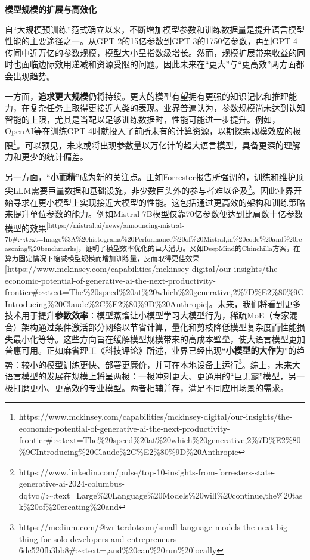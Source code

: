 \documentclass[
  letterpaper,
]{scrbook}
\begin{document}
\textbf{模型规模的扩展与高效化}

自``大规模预训练''范式确立以来，不断增加模型参数和训练数据量是提升语言模型性能的主要途径之一。从GPT-2的15亿参数到GPT-3的1750亿参数，再到GPT-4传闻中近万亿的参数规模，模型大小呈指数级增长。然而，规模扩展带来收益的同时也面临边际效用递减和资源受限的问题。因此未来在``更大''与``更高效''两方面都会出现趋势。

一方面，\textbf{追求更大规模}仍将持续。更大的模型有望拥有更强的知识记忆和推理能力，在复杂任务上取得更接近人类的表现。业界普遍认为，参数规模尚未达到认知智能的上限，尤其是当配以足够训练数据时，性能可能进一步提升。例如，OpenAI等在训练GPT-4时就投入了前所未有的计算资源，以期探索规模效应的极限\footnote{https://www.mckinsey.com/capabilities/mckinsey-digital/our-insights/the-economic-potential-of-generative-ai-the-next-productivity-frontier\#:\textasciitilde:text=The\%20speed\%20at\%20which\%20generative,2\%7D\%E2\%80\%9CIntroducing\%20Claude\%2C\%E2\%80\%9D\%20Anthropic}。可以预见，未来或将出现参数量以万亿计的超大语言模型，具备更深的理解力和更少的统计偏差。

另一方面，``\textbf{小而精}''成为新的关注点。正如Forrester报告所强调的，训练和维护顶尖LLM需要巨量数据和基础设施，非少数巨头外的参与者难以企及\footnote{https://www.linkedin.com/pulse/top-10-insights-from-forresters-state-generative-ai-2024-columbus-dqtvc\#:\textasciitilde:text=Large\%20Language\%20Models\%20will\%20continue,the\%20task\%20of\%20creating\%20and}。因此业界开始寻求在更小模型上实现接近大模型的性能。这包括通过更高效的架构和训练策略来提升单位参数的能力。例如Mistral
7B模型仅靠70亿参数便达到比肩数十亿参数模型的效果\textsuperscript{{[}https://mistral.ai/news/announcing-mistral-7b\#:\textasciitilde:text=Image\%3A\%20histograms\%20Performance\%20of\%20Mistral,in\%20code\%20and\%20reasoning\%20benchmarks{]}，证明了模型效率优化的巨大潜力。又如DeepMind的Chinchilla方案，在算力固定情况下缩减模型规模而增加训练量，反而取得更佳效果}{[}https://www.mckinsey.com/capabilities/mckinsey-digital/our-insights/the-economic-potential-of-generative-ai-the-next-productivity-frontier\#:\textasciitilde:text=The\%20speed\%20at\%20which\%20generative,2\%7D\%E2\%80\%9CIntroducing\%20Claude\%2C\%E2\%80\%9D\%20Anthropic{]}。未来，我们将看到更多技术用于提升\textbf{参数效率}：模型蒸馏让小模型学习大模型行为，稀疏MoE（专家混合）架构通过条件激活部分网络以节省计算，量化和剪枝降低模型复杂度而性能损失最小化等等。这些方向旨在缓解模型规模带来的高成本壁垒，使大语言模型更加普惠可用。正如麻省理工《科技评论》所述，业界已经出现``\textbf{小模型的大作为}''的趋势：较小的模型训练更快、部署更廉价，并可在本地设备上运行\footnote{https://medium.com/@writerdotcom/small-language-models-the-next-big-thing-for-solo-developers-and-entrepreneurs-6dc520fb3bb8\#:\textasciitilde:text=,and\%20can\%20run\%20locally}。综上，未来大语言模型的发展在规模上将呈两极：一极冲刺更大、更通用的``巨无霸''模型，另一极打磨更小、更高效的专业模型。两者相辅并存，满足不同应用场景的需求。
\end{document}
